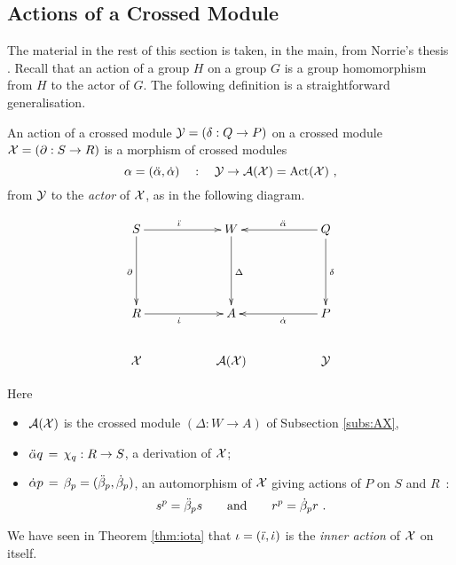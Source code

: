 

\subsection{Actions of a Crossed Module}
\label{subs:xmod-action}

The material in the rest of this section is taken, in the main, 
from Norrie's thesis \cite{norrie-thesis}.
Recall that an action of a group $H$ on a group $G$
is a group homomorphism from $H$ to the actor of $G$.
The following definition is a straightforward generalisation.

\begin{defn} 
An action of a crossed module  $\mathcal{Y} = (\delta : Q \to P)$
on a crossed module  $\mathcal{X} = (\partial : S \to R)$ 
is a morphism of crossed modules
$$
\alpha = (\ddot{\alpha},\dot{\alpha}) \quad : \quad \mathcal{Y} \to \mathcal{A}(\mathcal{X}) = \mathrm{Act}(\mathcal{X})~,
$$
from $\mathcal{Y}$ to the \emph{actor} of $\mathcal{X}$, as in the following diagram.

\begin{equation} \label{eq:sq2}
\vcenter{\xymatrix{ 
  S \ar[rr]^(0.45){\ddi} \ar[dd]_{\partial}
     && W \ar[dd]^{\Delta}
     && Q \ar[ll]_(0.45){\dda} \ar[dd]^{\delta}  \\
     &&  &&  \\
  R \ar[rr]_(0.45){\di}
     && A
     && P \ar[ll]^(0.45){\da}  \\
  \calX
     && \calA(\calX)
         && \calY  \\
}}
\end{equation}
\end{defn}

\noindent
Here 
\begin{itemize}
\item
$\mathcal{A}(\mathcal{X})$  is the crossed module  $(\Delta : W \to A)$ 
of Subsection \ref{subs:AX},
\item
$\ddot{\alpha} q \,=\, \chi_q : R \to S$, a derivation of $\mathcal{X}$;
\item
$\dot{\alpha} p \,=\, \beta_p = (\ddot{\beta}_p,\dot{\beta}_p)$,
an automorphism of  $\mathcal{X}$  giving actions of  $P$  on  $S$  and  $R$~:
$$
s^p = \ddot{\beta}_p s
\quad \quad \mbox{and} \quad \quad  
r^p = \dot{\beta}_p r ~.
$$
\end{itemize}

\noindent
We have seen in Theorem \ref{thm:iota} that $\iota = (\ddot{\iota},\dot{\iota})$ 
is the \emph{inner action} of $\mathcal{X}$ on itself.

